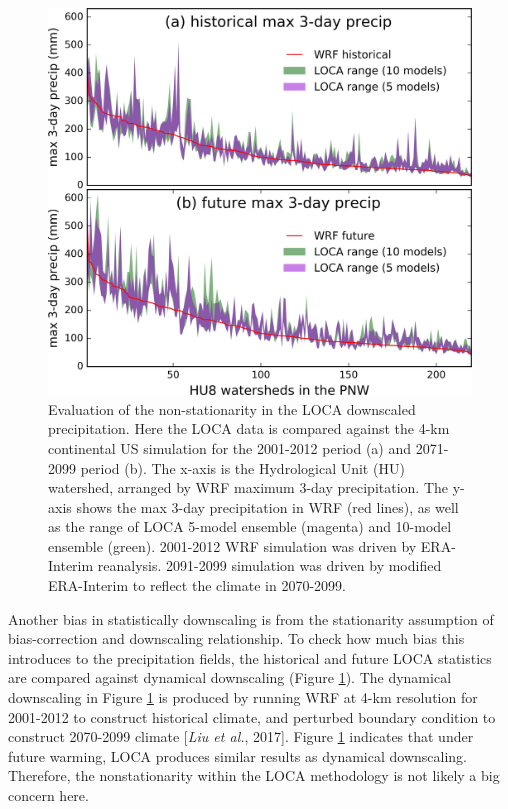 \begin{figure}[htbp]
	\includegraphics[width=\linewidth]{pics/ch5/fig14.jpg}
	\caption{Evaluation of the non-stationarity in the LOCA downscaled precipitation. Here the LOCA data is compared against the 4-km continental US simulation for the 2001-2012 period (a) and 2071-2099 period (b). The x-axis is the Hydrological Unit (HU) watershed, arranged by WRF maximum 3-day precipitation. The y-axis shows the max 3-day precipitation in WRF (red lines), as well as the range of LOCA 5-model ensemble (magenta) and 10-model ensemble (green). 2001-2012 WRF simulation was driven by ERA-Interim reanalysis. 2091-2099 simulation was driven by modified ERA-Interim to reflect the climate in 2070-2099.}
	\label{fig:5-14}
\end{figure}

Another bias in statistically downscaling is from the stationarity assumption of bias-correction and downscaling relationship. To check how much bias this introduces to the precipitation fields, the historical and future LOCA statistics are compared against dynamical downscaling (Figure \ref{fig:5-14}). The dynamical downscaling in Figure \ref{fig:5-14} is produced by running WRF at 4-km resolution for 2001-2012 to construct historical climate, and perturbed boundary condition to construct 2070-2099 climate [\textit{Liu et al.}, 2017]. Figure \ref{fig:5-14} indicates that under future warming, LOCA produces similar results as dynamical downscaling. Therefore, the nonstationarity within the LOCA methodology is not likely a big concern here.

